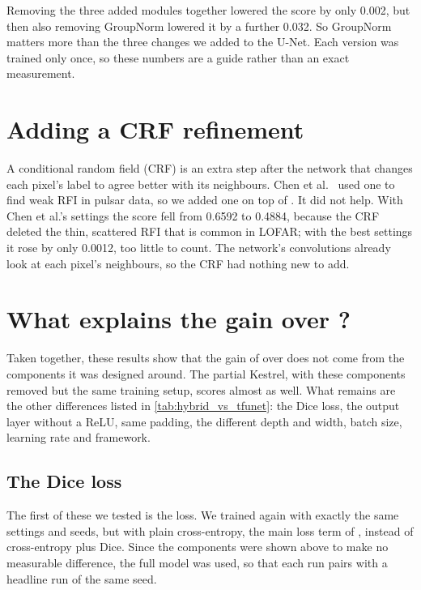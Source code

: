 Removing the three added modules together lowered the score by only 0.002,
but then also removing GroupNorm lowered it by a further 0.032. So GroupNorm
matters more than the three changes we added to the U-Net. Each version was trained only once, so
these numbers are a guide rather than an exact measurement.

\section{Adding a CRF refinement}
\label{sec:crf}
A conditional random field (CRF) is an extra step after the network that
changes each pixel's label to agree better with its neighbours. Chen et
al.~\cite{chen2023} used one to find weak RFI in pulsar data, so we added one
on top of \hybrid{}. It did not help. With Chen et al.'s settings the score fell
from 0.6592 to 0.4884, because the CRF deleted the thin, scattered RFI that is
common in LOFAR; with the best settings it rose by only 0.0012, too little to
count. The network's convolutions already look at each pixel's neighbours, so
the CRF had nothing new to add.

\section{What explains the gain over \tfunet{}?}
\label{sec:unexplained}
Taken together, these results show that the gain of \hybrid{} over \tfunet{}
does not come from the components it was designed around. The partial Kestrel,
with these components removed but the same training setup, scores almost as
well. What remains are the other
differences listed in \cref{tab:hybrid_vs_tfunet}: the Dice loss, the output
layer without a ReLU, same padding, the different depth and width, batch size,
learning rate and framework.

\subsection{The Dice loss}
\label{sec:dice}
The first of these we tested is the loss. We trained \hybrid{} again with
exactly the same settings and seeds, but with plain cross-entropy, the main
loss term of \tfunet{}, instead of cross-entropy plus Dice. Since the components were
shown above to make no measurable difference, the full model was used, so that
each run pairs with a headline run of the same seed.


